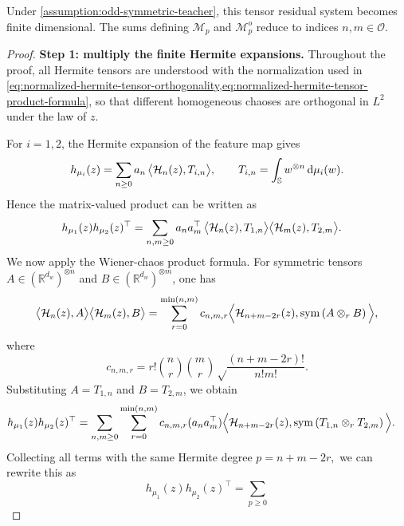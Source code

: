 \begin{remark}
    Under \cref{assumption:odd-symmetric-teacher}, this tensor residual system becomes finite dimensional. The sums defining \(\mathcal M_p\) and \(\mathcal M_p^o\) reduce to indices \(n,m\in\mathcal O\).
\end{remark}
\begin{proof}
\noindent\textbf{Step 1: multiply the finite Hermite expansions.}
Throughout the proof, all
Hermite tensors are understood with the normalization used in
\cref{eq:normalized-hermite-tensor-orthogonality,eq:normalized-hermite-tensor-product-formula}, so that different homogeneous chaoses are
orthogonal in \(L^2\) under the law of \(z\).

For \(i=1,2\), the Hermite expansion of the feature map gives
\begin{equation}
    h_{\mu_i}(z)
    =
    \sum_{n\ge0}
    a_n\,
    \big\langle \mathcal{H}_n(z),T_{i,n}\big\rangle,
    \qquad
    T_{i,n}
    =
    \int_{\mathbb{S}} w^{\otimes n}\,\dd\mu_i(w).
\end{equation}
Hence the matrix-valued product can be written as
\begin{align}
    h_{\mu_1}(z)h_{\mu_2}(z)^\top
    &=
    \sum_{n,m\ge0}
    a_n a_m^\top\,
    \big\langle \mathcal{H}_n(z),T_{1,n}\big\rangle
    \big\langle \mathcal{H}_m(z),T_{2,m}\big\rangle .
\end{align}
We now apply the Wiener-chaos product formula.  For symmetric tensors
\(A\in (\mathbb R^{d_w})^{\otimes n}\) and
\(B\in(\mathbb R^{d_w})^{\otimes m}\), one has
\begin{equation}
    \big\langle \mathcal{H}_n(z),A\big\rangle
    \big\langle \mathcal{H}_m(z),B\big\rangle
    =
    \sum_{r=0}^{\min(n,m)}
    c_{n,m,r}
    \Big\langle
        \mathcal{H}_{n+m-2r}(z),
        \mathrm{sym}\left({A\otimes_{r}B}\right)
    \Big\rangle,
\end{equation}
where
\[
    c_{n,m,r}
    =
    r!\binom nr\binom mr \sqrt\frac{(n+m-2r)!}{n!m!}.
\]
Substituting \(A=T_{1,n}\) and \(B=T_{2,m}\), we obtain
\begin{align}
    h_{\mu_1}(z)h_{\mu_2}(z)^\top
    &=
    \sum_{n,m\ge0}
    \sum_{r=0}^{\min(n,m)}
    c_{n,m,r}
    (a_n a_m^\top)
    \Big\langle
        \mathcal{H}_{n+m-2r}(z),
        \mathrm{sym}\left({T_{1,n}\otimes_{r}T_{2,m}}\right)
    \Big\rangle .
\end{align}
Collecting all terms with the same Hermite degree $p=n+m-2r,$
we can rewrite this as
\begin{equation}
    h_{\mu_1}(z)h_{\mu_2}(z)^\top
    =
    \sum_{p\ge0}

\end{equation}
\end{proof}
